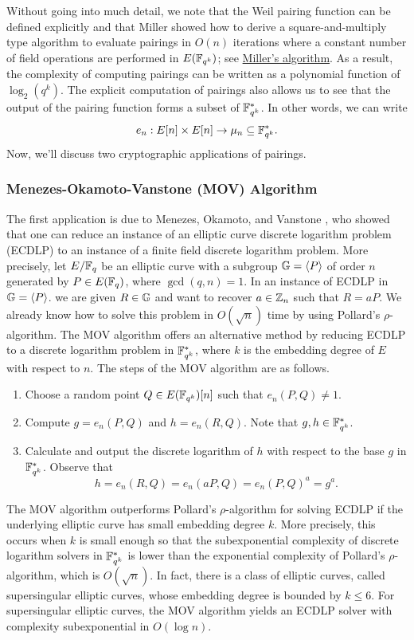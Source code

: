 Without going into much detail, we note that the Weil pairing function can be 
defined explicitly and that Miller showed how to derive a square-and-multiply 
type algorithm to evaluate pairings in $O(n)$ iterations where a constant 
number of field operations are performed in $E(\mathbb{F}_{q^k})$; see 
\href{https://crypto.stanford.edu/miller/miller.pdf}{Miller's algorithm}.
As a result, the complexity of computing pairings can be written as a polynomial
function of $\log_2(q^k)$. The explicit computation of pairings also allows us to 
see that the output of the pairing function forms a subset of $\mathbb{F}_{q^k}^*$. 
In other words, we can write 
\[ e_n : E[n] \times E[n] \to \mu_n \subseteq \mathbb{F}_{q^k}^*. \] 
Now, we'll discuss two cryptographic applications of pairings. 

\subsubsection{Menezes-Okamoto-Vanstone (MOV) Algorithm}
The first application is due to Menezes, Okamoto, and Vanstone \cite{259647}, 
who showed that one can reduce an instance of an elliptic curve discrete 
logarithm problem (ECDLP) to an instance of a finite field discrete logarithm
problem. More precisely, let $E/\mathbb{F}_q$ be an elliptic curve with a subgroup 
$\mathbb{G} = \langle P \rangle$ of order $n$ generated by $P \in E(\mathbb{F}_q)$, where 
$\gcd(q, n) = 1$. In an instance of ECDLP in $\mathbb{G} = \langle P \rangle$. 
we are given $R \in \mathbb{G}$ and want to recover $a \in \mathbb{Z}_n$ such that $R = aP$. 
We already know how to solve this problem in $O(\sqrt n)$ time by using 
Pollard's $\rho$-algorithm. The MOV algorithm offers an alternative method 
by reducing ECDLP to a discrete logarithm problem in $\mathbb{F}_{q^k}^*$, where 
$k$ is the embedding degree of $E$ with respect to $n$. The steps of 
the MOV algorithm are as follows. 
\begin{enumerate}
    \item Choose a random point $Q \in E(\mathbb{F}_{q^k})[n]$ such that $e_n(P, Q) \neq 1$. 
    \item Compute $g = e_n(P, Q)$ and $h = e_n(R, Q)$. Note that $g, h \in \mathbb{F}_{q^k}^*$. 
    \item Calculate and output the discrete logarithm of $h$ with respect to the base 
    $g$ in $\mathbb{F}_{q^k}^*$. Observe that 
    \[ h = e_n(R, Q) = e_n(aP, Q) = e_n(P, Q)^a = g^a. \] 
\end{enumerate}
The MOV algorithm outperforms Pollard's $\rho$-algorithm for solving ECDLP 
if the underlying elliptic curve has small embedding degree $k$. More precisely, 
this occurs when $k$ is small enough so that the subexponential complexity
of discrete logarithm solvers in $\mathbb{F}_{q^k}^*$ is lower than the exponential 
complexity of Pollard's $\rho$-algorithm, which is $O(\sqrt n)$. In fact, 
there is a class of elliptic curves, called supersingular elliptic curves, 
whose embedding degree is bounded by $k \leq 6$. For supersingular 
elliptic curves, the MOV algorithm yields an ECDLP solver with complexity 
subexponential in $O(\log n)$. 

